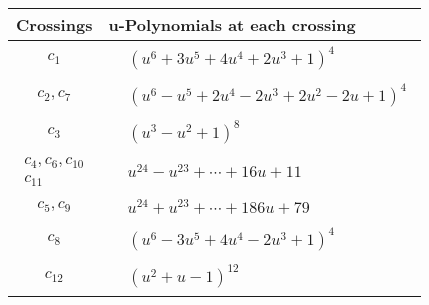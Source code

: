 \documentclass[1p]{elsarticle_modified}
\theoremstyle{definition}
\begin{document}
\begin{tabular}{m{50pt}|m{274pt}}
Crossings & \hspace{64pt}u-Polynomials at each crossing \\
\hline $$\begin{aligned}c_{1}\end{aligned}$$&$\begin{aligned}
&(u^6+3 u^5+4 u^4+2 u^3+1)^4
\end{aligned}$\\
\hline $$\begin{aligned}c_{2},c_{7}\end{aligned}$$&$\begin{aligned}
&(u^6- u^5+2 u^4-2 u^3+2 u^2-2 u+1)^4
\end{aligned}$\\
\hline $$\begin{aligned}c_{3}\end{aligned}$$&$\begin{aligned}
&(u^3- u^2+1)^8
\end{aligned}$\\
\hline $$\begin{aligned}c_{4},c_{6},c_{10}\\c_{11}\end{aligned}$$&$\begin{aligned}
&u^{24}- u^{23}+\cdots+16 u+11
\end{aligned}$\\
\hline $$\begin{aligned}c_{5},c_{9}\end{aligned}$$&$\begin{aligned}
&u^{24}+u^{23}+\cdots+186 u+79
\end{aligned}$\\
\hline $$\begin{aligned}c_{8}\end{aligned}$$&$\begin{aligned}
&(u^6-3 u^5+4 u^4-2 u^3+1)^4
\end{aligned}$\\
\hline $$\begin{aligned}c_{12}\end{aligned}$$&$\begin{aligned}
&(u^2+u-1)^{12}
\end{aligned}$\\
\hline
\end{tabular}\\~\\
\newpage\renewcommand{\arraystretch}{1}
\end{document}
